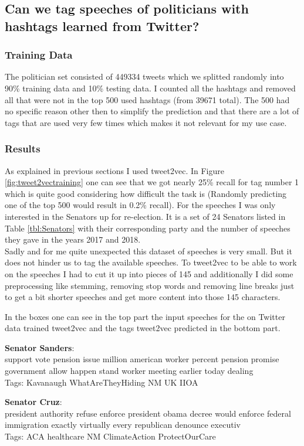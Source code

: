 \documentclass[10pt,conference,compsocconf]{IEEEtran}
\begin{document}
\subsection{Can we tag speeches of politicians with hashtags learned from Twitter? }
\subsubsection{Training Data}
The politician set consisted of 449334 tweets which we splitted randomly into 90\% training data and 10\% testing data. I counted all the hashtags and removed all that were not in the top 500 used hashtags (from 39671 total). The 500 had no specific reason other then to simplify the prediction and that there are a lot of tags that are used very few times which makes it not relevant for my use case. 

\subsubsection{Results}

As explained in previous sections I used tweet2vec.  In Figure \ref{fig:tweet2vectraining} one can see that we got nearly 25\% recall for tag number 1 which is quite good considering how difficult the task is (Randomly predicting one of the top 500 would result in 0.2\% recall). For the speeches I was only interested in the Senators up for re-election. It is a set of 24 Senators listed in Table \ref{tbl:Senators} with their corresponding party and the number of speeches they gave in the years 2017 and 2018. \\
Sadly and for me quite unexpected this dataset of speeches is very small.  But it does not hinder us to tag the available speeches. To tweet2vec to be able to work on the speeches I had to cut it up into pieces of 145 and additionally I did some preprocessing like stemming, removing stop words and removing line breaks just to get a bit shorter speeches and get more content into those 145 characters. 

In the boxes one can see in the top part the input speeches for the on Twitter data trained tweet2vec and the tags tweet2vec predicted in the bottom part. 

\begin{framed}
	\textbf{Senator Sanders}: \\
	support vote pension issue million american worker percent pension promise government allow happen stand worker meeting earlier today dealing \\
	Tags: Kavanaugh WhatAreTheyHiding NM UK IIOA
\end{framed}
\begin{framed}
	\textbf{Senator Cruz}: \\
 president authority refuse enforce president obama decree would enforce federal immigration exactly virtually every republican denounce executiv
 \\
	Tags: ACA healthcare NM ClimateAction ProtectOurCare
\end{framed}
\end{document}
